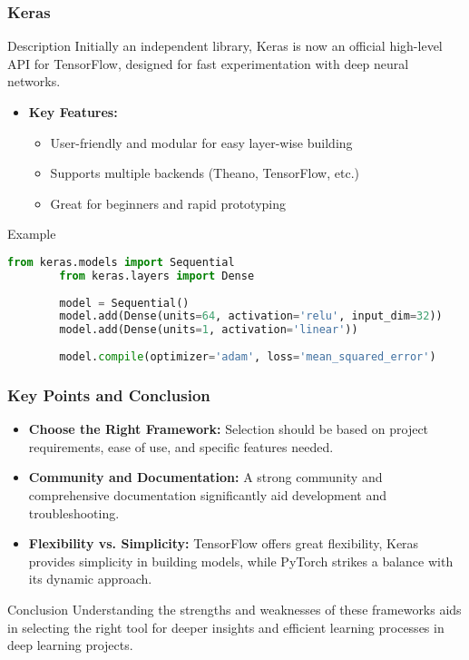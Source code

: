 \documentclass[aspectratio=169]{beamer}
\begin{document}
\begin{frame}[fragile]
    \frametitle{Keras}
    \begin{block}{Description}
        Initially an independent library, Keras is now an official high-level API for TensorFlow, designed for fast experimentation with deep neural networks.
    \end{block}
    \begin{itemize}
        \item \textbf{Key Features:}
            \begin{itemize}
                \item User-friendly and modular for easy layer-wise building
                \item Supports multiple backends (Theano, TensorFlow, etc.)
                \item Great for beginners and rapid prototyping
            \end{itemize}
    \end{itemize}
    \begin{block}{Example}
        \begin{lstlisting}[language=Python]
        from keras.models import Sequential
        from keras.layers import Dense
        
        model = Sequential()
        model.add(Dense(units=64, activation='relu', input_dim=32))
        model.add(Dense(units=1, activation='linear'))
        
        model.compile(optimizer='adam', loss='mean_squared_error')
        \end{lstlisting}
    \end{block}
\end{frame}

\begin{frame}
    \frametitle{Key Points and Conclusion}
    \begin{itemize}
        \item \textbf{Choose the Right Framework:} 
            Selection should be based on project requirements, ease of use, and specific features needed.
        \item \textbf{Community and Documentation:} 
            A strong community and comprehensive documentation significantly aid development and troubleshooting.
        \item \textbf{Flexibility vs. Simplicity:}
            TensorFlow offers great flexibility, Keras provides simplicity in building models, while PyTorch strikes a balance with its dynamic approach.
    \end{itemize}
    \begin{block}{Conclusion}
        Understanding the strengths and weaknesses of these frameworks aids in selecting the right tool for deeper insights and efficient learning processes in deep learning projects. 
    \end{block}
\end{frame}
\end{document}
